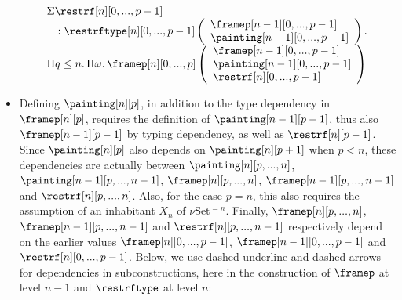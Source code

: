 \documentclass{msc}
\begin{document}
\begin{itemize}
$$\begin{array}{llcl}
            \begin{array}{l}
              \Sigma \restrf[n][0,...,p-1]    \\
              \quad:\restrftype[n][0,...,p-1]
              \left(\begin{array}{l}
                        \framep[n-1][0,...,p-1]   \\
                        \painting[n-1][0,...,p-1] \\
                      \end{array}\right)
              .\,                             \\
              \Pi q\leq n.\,\Pi \omega.\,\framep[n][0,...,p]
              \left(\begin{array}{l}
                        \framep[n-1][0,...,p-1]   \\
                        \painting[n-1][0,...,p-1] \\
                        \restrf[n][0,...,p-1]     \\
                      \end{array}\right) \\
            \end{array}                             \\
          \end{array}
        $$
  \item Defining $\painting[n][p]$, in addition to the type dependency
        in $\framep[n][p]$, requires the definition of
        $\painting[n-1][p-1]$, thus also $\framep[n-1][p-1]$ by typing
        dependency, as well as $\restrf[n][p-1]$. Since
        $\painting[n][p]$ also depends on $\painting[n][p+1]$ when $p<n$,
        these dependencies are actually between $\painting[n][p,...,n]$,
        $\painting[n-1][p,...,n-1]$, $\framep[n][p,...,n]$,
        $\framep[n-1][p,...,n-1]$ and $\restrf[n][p,...,n]$. Also,
        for the case $p=n$, this also requires the assumption of an
        inhabitant $X_{n}$ of $\nu$Set$^{=n}$. Finally,
        $\framep[n][p,...,n]$, $\framep[n-1][p,...,n-1]$ and
        $\restrf[n][p,...,n-1]$ respectively depend on the earlier
        values $\framep[n][0,...,p-1]$, $\framep[n-1][0,...,p-1]$ and
        $\restrf[n][0,...,p-1]$.  Below, we use dashed underline and
        dashed arrows for dependencies in subconstructions, here in the
        construction of $\framep$ at level $n-1$ and $\restrftype$ at
        level $n$:
        \begin{center}
          \fontsize{7.2}{9}\selectfont

\end{center}
\end{itemize}
\end{document}

